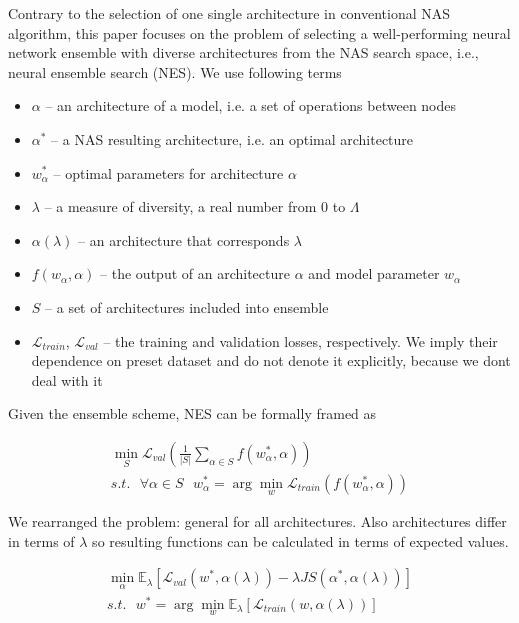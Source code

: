 \documentclass{article}
\begin{document}
Contrary to the selection of one single architecture in conventional NAS algorithm, this paper focuses on the problem of selecting a well-performing neural network ensemble with diverse architectures from the NAS search space, i.e., neural ensemble search (NES). We use following terms
\begin{itemize}
    \item $\alpha$ -- an architecture of a model, i.e. a set of operations between nodes
    \item $\alpha^*$ -- a NAS resulting architecture, i.e. an optimal architecture
    \item $w_\alpha^*$ -- optimal parameters for architecture $\alpha$
    \item $\lambda$ -- a measure of diversity, a real number from $0$ to $\Lambda$
    \item $\alpha(\lambda)$ -- an architecture that corresponds $\lambda$ 
    \item $f(w_\alpha, \alpha)$ -- the output of an architecture $\alpha$ and model parameter $w_\alpha$
    \item $S$ -- a set of architectures included into ensemble
    \item $\mathcal{L}_{train}$, $\mathcal{L}_{val}$ -- the training and validation losses, respectively. We imply their dependence on preset dataset and do not denote it explicitly, because we dont deal with it
\end{itemize}

Given the ensemble scheme, NES can be formally framed as

\begin{gather*}
	\min_S \mathcal{L}_{val}\left(\frac{1}{|S|}\sum_{\alpha \in S}f(w_\alpha^*, \alpha)\right) \\
s.t. \text{ }\forall \alpha \in S \text{ } w_\alpha^* = \arg \min_w \mathcal{L}_{train}(f(w_\alpha^*, \alpha))
\end{gather*}

We rearranged the problem:  general for all architectures. Also architectures differ in terms of $\lambda$ so resulting functions can be calculated in terms of expected values.

\begin{gather*}
    \min_{\alpha} \mathbb{E}_\lambda [\mathcal{L}_{val}(w^*, \alpha(\lambda)) - \lambda JS(\alpha^*, \alpha(\lambda))] \\
    s.t. \text{ } w^* = \arg \min_w \mathbb{E}_\lambda[\mathcal{L}_{train}(w, \alpha(\lambda))]
\end{gather*}
\end{document}
